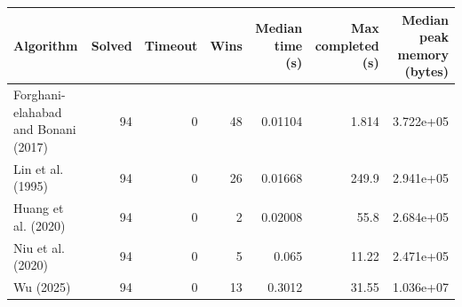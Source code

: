 \begin{tabular}{lrrrrrr}
\toprule
Algorithm & Solved & Timeout & Wins & Median time (s) & Max completed (s) & Median peak memory (bytes) \\
\midrule
Forghani-elahabad and Bonani (2017) & 94 & 0 & 48 & 0.01104 & 1.814 & 3.722e+05 \\
Lin et al. (1995) & 94 & 0 & 26 & 0.01668 & 249.9 & 2.941e+05 \\
Huang et al. (2020) & 94 & 0 & 2 & 0.02008 & 55.8 & 2.684e+05 \\
Niu et al. (2020) & 94 & 0 & 5 & 0.065 & 11.22 & 2.471e+05 \\
Wu (2025) & 94 & 0 & 13 & 0.3012 & 31.55 & 1.036e+07 \\
\bottomrule
\end{tabular}
